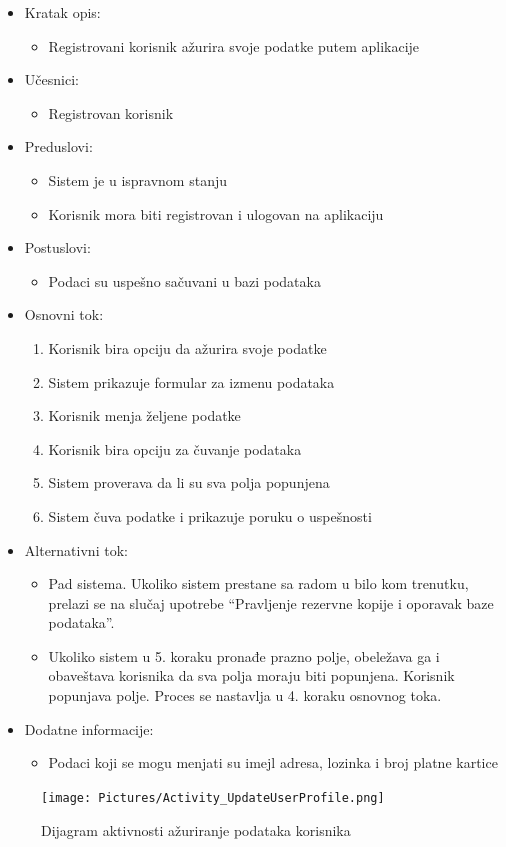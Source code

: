 \begin{itemize}
    \item Kratak opis:
        \begin{itemize}
            \item Registrovani korisnik ažurira svoje podatke putem aplikacije
        \end{itemize}
    \item Učesnici:
        \begin{itemize}
            \item Registrovan korisnik
        \end{itemize}
    \item Preduslovi:
        \begin{itemize}
            \item Sistem je u ispravnom stanju
            \item Korisnik mora biti registrovan i ulogovan na aplikaciju
        \end{itemize}
    \item Postuslovi:
        \begin{itemize}
            \item Podaci su uspešno sačuvani u bazi podataka
        \end{itemize}
    \item Osnovni tok:
        \begin{enumerate}
            \item Korisnik bira opciju da ažurira svoje podatke
            \item Sistem prikazuje formular za izmenu podataka
            \item Korisnik menja željene podatke 
            \item Korisnik bira opciju za čuvanje podataka
            \item Sistem proverava da li su sva polja popunjena
            \item Sistem čuva podatke i prikazuje poruku o uspešnosti
        \end{enumerate}
    \item Alternativni tok:
        \begin{itemize}
            \item Pad sistema. Ukoliko sistem prestane sa radom u bilo kom trenutku, prelazi se na slučaj upotrebe ``Pravljenje rezervne kopije i oporavak baze podataka''.
            \item Ukoliko sistem u 5. koraku pronađe prazno polje, obeležava ga i obaveštava korisnika da sva polja moraju biti popunjena. Korisnik popunjava polje. Proces se nastavlja u 4. koraku osnovnog toka.
        \end{itemize}
    \item Dodatne informacije:
        \begin{itemize}
            \item Podaci koji se mogu menjati su imejl adresa, lozinka i broj platne kartice
        \end{itemize}
\end{itemize}

\begin{figure}[H]
\begin{center}
\texttt{[image: Pictures/Activity\_UpdateUserProfile.png]}
\end{center}
    \caption{Dijagram aktivnosti ažuriranje podataka korisnika}
\label{fig:RegistracijaKorisnika}
\end{figure}